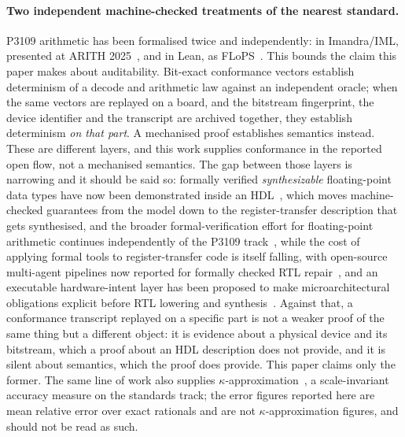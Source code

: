 \documentclass[11pt]{article}
\theoremstyle{definition}
\begin{document}
\paragraph{Two independent machine-checked treatments of the nearest standard.}
P3109 arithmetic has been formalised twice and independently: in Imandra/IML,
presented at ARITH 2025~\cite{wintersteiger2025}, and in Lean, as
FLoPS~\cite{flops2026}. This bounds the claim this paper makes about
auditability. Bit-exact conformance vectors establish determinism of a decode
and arithmetic law against an independent oracle; when the same vectors are
replayed on a board, and the bitstream fingerprint, the device identifier and the
transcript are archived together, they establish determinism \emph{on that part}.
A mechanised proof establishes semantics instead. These are different layers, and
this work supplies conformance in the reported open flow, not a mechanised
semantics. The gap between those layers is narrowing and it should be said so:
formally verified \emph{synthesizable} floating-point data types have now been
demonstrated inside an HDL~\cite{archhdl2026}, which moves machine-checked
guarantees from the model down to the register-transfer description that gets
synthesised, and the broader formal-verification effort for floating-point
arithmetic continues independently of the P3109 track~\cite{mohanty2025}, while
the cost of applying formal tools to register-transfer code is itself falling, with
open-source multi-agent pipelines now reported for formally checked RTL
repair~\cite{tran2026rtlrepair}, and an executable hardware-intent layer has been
proposed to make microarchitectural obligations explicit before RTL lowering
and synthesis~\cite{cheng2026hint}. Against
that, a conformance transcript replayed on a specific part is not a weaker proof
of the same thing but a different object: it is evidence about a physical device
and its bitstream, which a proof about an HDL description does not provide, and it
is silent about semantics, which the proof does provide. This paper claims only
the former. The same line of
work also supplies $\kappa$-approximation~\cite{fitzgibbon2026kappa}, a
scale-invariant accuracy measure on the standards track; the error figures
reported here are mean relative error over exact rationals and are not
$\kappa$-approximation figures, and should not be read as such.
\end{document}
